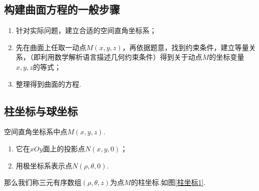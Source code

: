 \subsection{构建曲面方程的一般步骤}
\begin{enumerate}[1.]
	\setlength{\itemindent}{2em}
	\setlength{\topsep}{0.01em}
	\setlength{\itemsep}{0.01em}
	\item 针对实际问题，{\color{dy}建立合适的空间直角坐标系}；
	\item 先在曲面上任取一{\color{dy}动点$M(x,y,z)$}，再依据题意，{\color{dy}找到约束条件，建立等量关系}，（即利用数学解析语言描述几何约束条件）得到{\color{dy}关于动点$M$的坐标变量$x,y,z$的等式}；
	\item 整理得到{\color{dy}曲面的方程}.
\end{enumerate}

\subsection{柱坐标与球坐标}
\label{柱坐标}
\noindent
\tdefination[柱坐标]
空间直角坐标系中点$M(x,y,z).$
\begin{enumerate}[(1)]
	\setlength{\itemindent}{3em}
	\setlength{\topsep}{0.01em}
	\setlength{\itemsep}{0.01em}
	\item 它在$xOy$面上的投影点$N(x,y,0)$；
	\item 用极坐标系表示点$N(\rho ,\theta ,0)$.
\end{enumerate}
\par 那么我们称三元有序数组$(\rho ,\theta ,z)$为点$M$的{\color{dy}柱坐标}.如图\ref{柱坐标1}.
